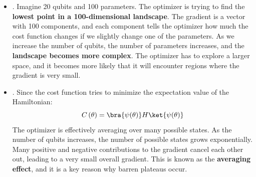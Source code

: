 \begin{itemize}
    \highspace
    Geometrically, the optimizer is trying to find the \textbf{lowest point} in a very high-dimensional landscape. The landscape is defined by the cost function $C\left(\theta\right)$, which assigns a height (energy) to every point (parameter configuration) in the landscape. To \textbf{reach the lowest point}, the optimizer needs to know which direction to move in the landscape. The \hl{gradient is the only information that tells the optimizer which direction to move}:
    \begin{equation*}
        \nabla C\left(\theta\right) = \left(\frac{\partial C}{\partial \theta_1}, \frac{\partial C}{\partial \theta_2}, \ldots, \frac{\partial C}{\partial \theta_n}\right)
    \end{equation*}
    For each parameter $\theta_i$, the gradient tells the optimizer how much the cost function changes if we slightly change $\theta_i$. After computing the gradient, the optimizer updates the parameters $\theta$ in the direction of the negative gradient to decrease the cost function. We do not present the details of the optimization algorithm here, but the key point is that \textbf{the optimizer relies on the gradient to find the lowest point in the landscape}.


    \item {}. Imagine 20 qubits and 100 parameters. The optimizer is trying to find the \textbf{lowest point in a 100-dimensional landscape}. The gradient is a vector with 100 components, and each component tells the optimizer how much the cost function changes if we slightly change one of the parameters. As we increase the number of qubits, the number of parameters increases, and the \textbf{landscape becomes more complex}. The optimizer has to explore a larger space, and it becomes more likely that it will encounter regions where the gradient is very small.
    

    \item {}. Since the cost function tries to minimize the expectation value of the Hamiltonian:
    \begin{equation*}
        C\left(\theta\right) = \bra{\psi(\theta)} H \ket{\psi(\theta)}
    \end{equation*}
    The optimizer is effectively averaging over many possible states. As the number of qubits increases, the number of possible states grows exponentially. Many positive and negative contributions to the gradient cancel each other out, leading to a very small overall gradient. This is known as the \textbf{averaging effect}, and it is a key reason why barren plateaus occur.


\end{itemize}
